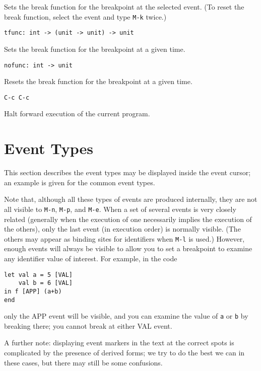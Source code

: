 Sets the break function for the breakpoint at the selected event.  (To
reset the break function, select the event and type \verb'M-k' twice.) 

\begin{verbatim}
tfunc: int -> (unit -> unit) -> unit
\end{verbatim}

Sets the break function for the breakpoint at a given time.

\begin{verbatim}
nofunc: int -> unit
\end{verbatim}

Resets the break function for the breakpoint at a given time.

\begin{verbatim}
C-c C-c
\end{verbatim}

Halt forward execution of the current program.


\section{Event Types}
This section describes the event types may be displayed 
inside the event cursor; an example is given for the common event types.

Note that, although all these types of events are produced internally, they
are not all visible to \verb'M-n', \verb'M-p', and \verb'M-e'.  When a set of
several events is very closely related (generally when the execution of 
one necessarily implies the execution of the others), only the last event
(in execution order) is normally visible.  (The others may appear as 
binding sites for identifiers when \verb'M-l' is used.)  However, enough 
events will always be visible to allow you to set a breakpoint to 
examine any identifier value of interest. For example, in the code

\begin{verbatim}
let val a = 5 [VAL]
    val b = 6 [VAL]
in f [APP] (a+b)
end
\end{verbatim}

only the APP event will be visible, and you can examine 
the value of \verb'a' or \verb'b' by breaking there; you cannot break
at either VAL event.
 
A further note: displaying event markers in the text at the correct spots
is complicated by the presence of derived forms; we try to do the best
we can in these cases, but there may still be some confusions.

